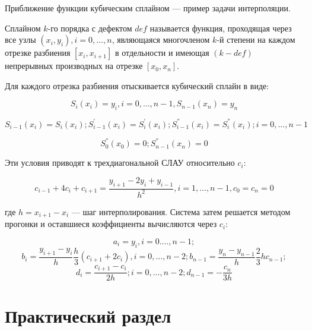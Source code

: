 \documentclass[14pt, russian]{scrartcl}
\begin{document}
Приближение функции кубическим сплайном --- пример задачи интерполяции.

Сплайном $k$-го порядка с дефектом $def$ называется функция, проходящая через
все узлы $(x_{i}, y_{i}), i=0, \ldots{}, n$, являющаяся многочленом $k$-й
степени на каждом отрезке разбиения $[x_{i}, x_{i+1}]$ в отдельности и имеющая
$(k - def)$ непрерывных производных на отрезке $[x_{0}, x_{n}]$.

Для каждого отрезка разбиения отыскивается кубический сплайн в виде:

\begin{equation}
  S_{i}(x_{i}) = y_{i}, i=0, \ldots{}, n-1, S_{n-1}(x_{n}) = y_{n}
\end{equation}

\begin{equation}
  S_{i-1}(x_{i}) = S_{i}(x_{i}); S_{i-1}^{'}(x_{i}) = S_{i}^{'}(x_{i}); S_{i-1}^{''}(x_{i}) = S_{i}^{''}(x_{i}); i=0, \ldots{}, n-1
\end{equation}

\begin{equation}
  S_{0}^{''}(x_{0}) = 0; S_{n-1}^{''}(x_{n}) = 0
\end{equation}

Эти условия приводят к трехдиагональной СЛАУ относительно $c_{i}$:

\begin{equation}
  c_{i-1} + 4c_{i} + c_{i+1} = \frac{y_{i+1} - 2y_{i} + y_{i-1}}{h^{2}}, i=1, \ldots{}, n-1, c_{0} = c_{n} = 0
\end{equation}

где $h = x_{i+1} - x_{i}$ --- шаг интерполирования. Система затем решается
методом прогонки и оставшиеся коэффициенты вычисляются через $c_{i}$:

\begin{equation}
  a_{i} = y_{i}, i=0. \ldots{}, n-1;
\end{equation}
\begin{equation}
  b_{i} = \frac{y_{i+1} - y_{i}}{h} \frac{h}{3} (c_{i+1} + 2c_{i}), i=0, \ldots, n-2; b_{n-1} = \frac{y_{n} - y_{n-1}}{h} \frac{2}{3} h c_{n-1};
\end{equation}
\begin{equation}
  d_{i} = \frac{c_{i+1} - c_{i}}{2h}; i = 0, \ldots, n-2; d_{n-1} = - \frac{c_{n}}{3h}
\end{equation}

\section{Практический раздел}
\end{document}

